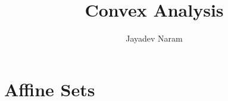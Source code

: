 \documentclass[11pt,a4paper]{article}
\author{Jayadev Naram}
\title{Convex Analysis}
\begin{document}
\maketitle
\tableofcontents

\theoremstyle{plain}
\newtheorem{theorem}{Theorem}[section]
\newtheorem{corollary}{Corollary}[theorem]

\newtheorem{lemma}[theorem]{Lemma}
\newtheorem{proposition}[theorem]{Proposition}
\newtheorem{assume}{Assumption}

\theoremstyle{definition}
\newtheorem{definition}[theorem]{Definition}
\newtheorem{example}[theorem]{Example}
\newtheorem{remark}[theorem]{Remark}

\newcommand{\R}{\mathbb{R}}
\newcommand{\B}{\mathbb{B}}
\newcommand{\A}{\mathcal{A}}
\newcommand{\M}{\mathcal{M}}
\newcommand{\N}{\mathcal{N}}
\newcommand{\h}{\mathcal{H}}
\newcommand{\T}{\mathcal{T}}
\newcommand{\Prob}{\mathbb{P}}
\newcommand{\Dist}{\mathcal{D}}
\newcommand{\perpProj}{\mathcal{P}^\perp}
\newcommand{\bb}{\mathbb{B}}
\newcommand{\Sprod}{\mathbb{S}_{xy}}
\newcommand{\highlight}[1]{\underline{\textit{\textbf{#1}}}}
\newcommand{\mapping}[3]{#1:#2\rightarrow #3}
\newcommand{\doubt}{\highlight{[??]}}
\newcommand{\bigvert}[2]{\left.#1\right|_{#2}}
\newcommand{\sdnn}[1]{${#1}$}
\newcommand{\bsdnn}[1]{$\boldsymbol{#1}$}
\newcommand{\ifthen}[2]{\textbf{(#1)}\boldsymbol{\implies}\textbf{(#2)}}
\newcommand{\bsdn}[1]{\boldsymbol{#1}}
\newcommand{\forward}{$(\implies)$\ }
\newcommand{\converse}{$(\impliedby)$\ }
\newcommand{\Lt}[1]{\underset{#1\rightarrow 0}{Lt}}
\newcommand{\norm}[1]{\|#1\|}
\newcommand{\dparder}[2]{\dfrac{\partial #1}{\partial x_{#2}}}
\newcommand{\fparder}[2]{\frac{\partial #1}{\partial x_{#2}}}
\newcommand{\parder}[2]{\partial #1/\partial x_{#2}}
\newcommand{\parop}[1]{\dfrac{\partial}{\partial x_{#1}}}
\newcommand{\innerproduct}[2]{\langle #1, #2 \rangle}
\newcommand{\metric}[2]{[#1, #2]}
\newcommand{\genst}{St_B(n,p)}
\newcommand{\igenst}[1]{St_{B_{#1}}(n_{#1},p)}
\newcommand{\realmat}[2]{\R^{#1\times #2}}
\newcommand{\Skew}{\mathcal{S}_{skew}(p)}
\newcommand{\Sym}{\mathcal{S}_{sym}(p)}
\newcommand{\XperpB}{X_{B^\perp}}
\newcommand{\polarRetr}{R^{polar}_X}
\newcommand{\qrRetr}{R^{QR}_X}
\newcommand{\vectransport}{\mathcal{T}}
\newcommand{\grad}{\text{grad}\,}
\newcommand{\hess}{\text{Hess}\,}

\section{Affine Sets}
\end{document}
